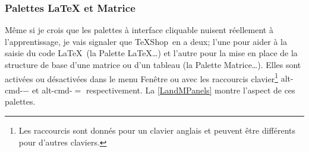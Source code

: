 \documentclass[11pt,french]{article}
\newcommand{\TS}{\textsf{\TeX Shop}}
\newcommand{\cmd}[1]{\textsf{#1}}
\newcommand{\mnu}[1]{\textsf{#1}}
\newcommand{\To}{\,\(\to\)\,}
\begin{document}


\subsubsection{Palettes LaTeX et Matrice}

Même si je crois que les palettes à interface cliquable nuisent réellement à l'apprentissage, je vais signaler que \TS\ en a deux; l'une pour aider à la saisie du code \LaTeX\ (la \mnu{Palette LaTeX…}) et l'autre pour la mise en place de la structure de base d'une matrice ou d'un tableau (la \mnu{Palette Matrice…}). Elles sont activées ou désactivées dans le menu \mnu{Fenêtre} ou avec les raccourcis clavier\footnote{Les raccourcis sont donnés pour un clavier anglais et peuvent être différents pour d'autres claviers.} \cmd{alt-cmd-{}$-$} et \cmd{alt-cmd-$=$} respectivement. La \vref{LandMPanels} montre l'aspect de ces palettes.
\end{document}
